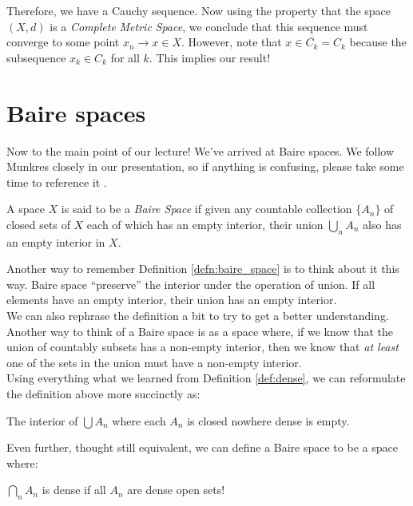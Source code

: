 \documentclass[english, 11pt]{article}
\begin{document}
  Therefore, we have a Cauchy sequence. Now using the property that the space $(X,d)$ is a \textit{Complete} \textit{Metric} \textit{Space}, we conclude that this sequence must converge to some point $x_n \to x \in X$. However, note that $x \in \bar{C_k} = C_k$ because the subsequence $x_k \in C_k$ for all $k$. This implies our result!

  \section{Baire spaces}
  Now to the main point of our lecture! We've arrived at Baire spaces. We follow Munkres closely in our presentation, so if anything is confusing, please take some time to reference it \cite{topology_book}.

  \begin{defn}
  \label{defn:baire_space}
  A space $X$ is said to be a \textit{Baire Space} if given any countable collection $\{A_n\}$ of closed sets of $X$ each of which has an empty interior, their union $\bigcup_n A_n$ also has an empty interior in $X$.
  \end{defn}

  Another way to remember Definition \ref{defn:baire_space} is to think about it this way. Baire space ``preserve'' the interior under the operation of union. If all elements have an empty interior, their union has an empty interior. \\

  We can also rephrase the definition a bit to try to get a better understanding. Another way to think of a Baire space is as a space where, if we know that the union of countably subsets has a non-empty interior, then we know that \textit{at least} one of the sets in the union must have a non-empty interior.\\

  Using everything what we learned from Definition \ref{def:dense}, we can reformulate the definition above more succinctly as:
  \begin{defn}
  \label{defn:baire_closed}
  The interior of $\bigcup A_n$ where each $A_n$ is closed nowhere dense is empty.
  \end{defn}

  Even further, thought still equivalent, we can define a Baire space to be a space where:
  \begin{defn}
  \label{defn:baire_open}
  $\bigcap_n A_n$ is dense if all $A_n$ are dense open sets!
  \end{defn}
\end{document}
